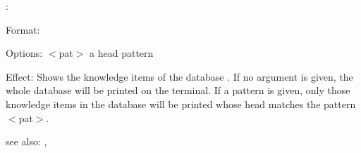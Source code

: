 :

Format: \\

Options: $<$pat$>$ a head pattern

Effect: Shows the knowledge items of the database . If no 
	argument is given, the whole database will be printed on the terminal.  
	If a pattern is given, only those knowledge items in the database will
	be printed whose head matches the pattern $<$pat$>$.

see also: \consult, 
